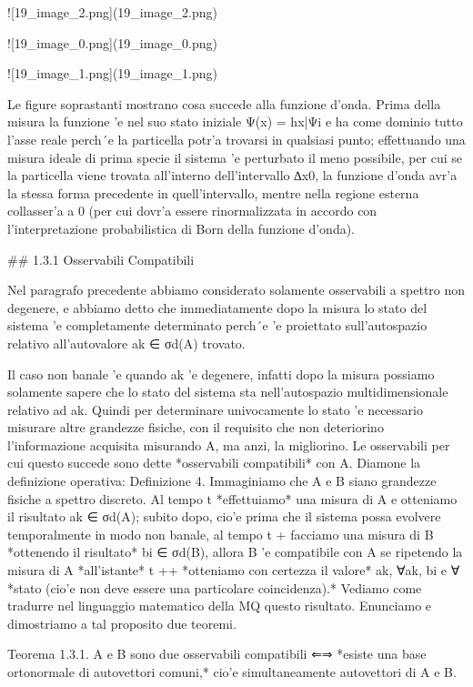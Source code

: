 {	![19_image_2.png](19_image_2.png)
	
	![19_image_0.png](19_image_0.png)
	
	![19_image_1.png](19_image_1.png)
	
	Le figure soprastanti mostrano cosa succede alla funzione d'onda. Prima della misura la funzione 'e nel suo stato iniziale Ψ(x) = hx|Ψi e ha come dominio tutto l'asse reale perch´e la particella potr'a trovarsi in qualsiasi punto; effettuando una misura ideale di prima specie il sistema 'e perturbato il meno possibile, per cui se la particella viene trovata all'interno dell'intervallo ∆x0, la funzione d'onda avr'a la stessa forma precedente in quell'intervallo, mentre nella regione esterna collasser'a a 0 (per cui dovr'a essere rinormalizzata in accordo con l'interpretazione probabilistica di Born della funzione d'onda).
	
	## 1.3.1 Osservabili Compatibili
	
	Nel paragrafo precedente abbiamo considerato solamente osservabili a spettro non degenere, e abbiamo detto che immediatamente dopo la misura lo stato del sistema 'e completamente determinato perch´e 'e proiettato sull'autospazio relativo all'autovalore ak ∈ σd(A) trovato.
	
	Il caso non banale 'e quando ak 'e degenere, infatti dopo la misura possiamo solamente sapere che lo stato del sistema sta nell'autospazio multidimensionale relativo ad ak. Quindi per determinare univocamente lo stato 'e necessario misurare altre grandezze fisiche, con il requisito che non deteriorino l'informazione acquisita misurando A, ma anzi, la migliorino. Le osservabili per cui questo succede sono dette *osservabili compatibili* con A. Diamone la definizione operativa:
	Definizione 4. Immaginiamo che A e B siano grandezze fisiche a spettro discreto. Al tempo t *effettuiamo* una misura di A e otteniamo il risultato ak ∈ σd(A); subito dopo, cio'e prima che il sistema possa evolvere temporalmente in modo non banale, al tempo t
	+ facciamo una misura di B *ottenendo il risultato* bi ∈ σd(B),
	allora B 'e compatibile con A se ripetendo la misura di A *all'istante* t
	++ *otteniamo con certezza il valore* ak,
	∀ak, bi e ∀ *stato (cio'e non deve essere una particolare coincidenza).*
	Vediamo come tradurre nel linguaggio matematico della MQ questo risultato. Enunciamo e dimostriamo a tal proposito due teoremi.
	
	Teorema 1.3.1. A e B sono due osservabili compatibili ⇐⇒ *esiste una base ortonormale di autovettori comuni,*
	cio'e simultaneamente autovettori di A e B.
	
}
